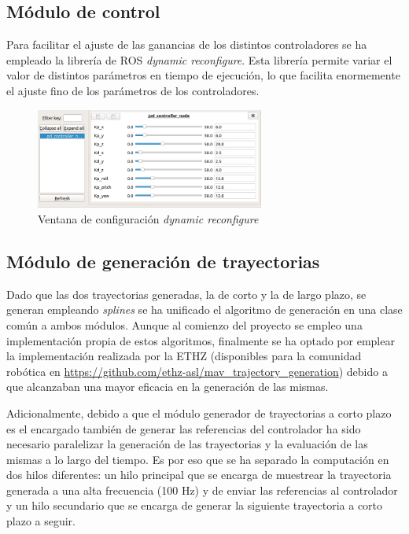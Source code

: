 \subsection{Módulo de control}

Para facilitar el ajuste de las ganancias de los distintos controladores se ha empleado la librería de ROS \textit{dynamic reconfigure}. Esta librería permite variar el valor de distintos parámetros en tiempo de ejecución, lo que facilita enormemente el ajuste fino de los parámetros de los controladores. 
\begin{figure}[htb!]
	\centering
	\includegraphics[width=0.67\textwidth]{imagenes/Rqt}
	\caption{Ventana de configuración \textit{dynamic reconfigure}}
	\label{waypoints:circuito}
\end{figure}



\newpage
\subsection{Módulo de generación de trayectorias}

Dado que las dos trayectorias generadas, la de corto y la de largo plazo, se generan empleando \textit{splines} se ha unificado el algoritmo de generación en una clase común a ambos módulos. Aunque al comienzo del proyecto se empleo una implementación propia de estos algoritmos, finalmente se ha optado por emplear la implementación realizada por la ETHZ (disponibles para la comunidad robótica en \url{https://github.com/ethz-asl/mav_trajectory_generation}) debido a que alcanzaban una mayor eficacia en la generación de las mismas.

Adicionalmente, debido a que el módulo generador de trayectorias a corto plazo es el encargado también de generar las referencias del controlador ha sido necesario paralelizar la generación de las trayectorias y la evaluación de las mismas a lo largo del tiempo. Es por eso que se ha separado la computación en dos hilos diferentes: un hilo principal que se encarga de muestrear la trayectoria generada a una alta frecuencia (100 Hz) y de enviar las referencias al controlador y un hilo secundario que se encarga de generar la siguiente trayectoria a corto plazo a seguir.






